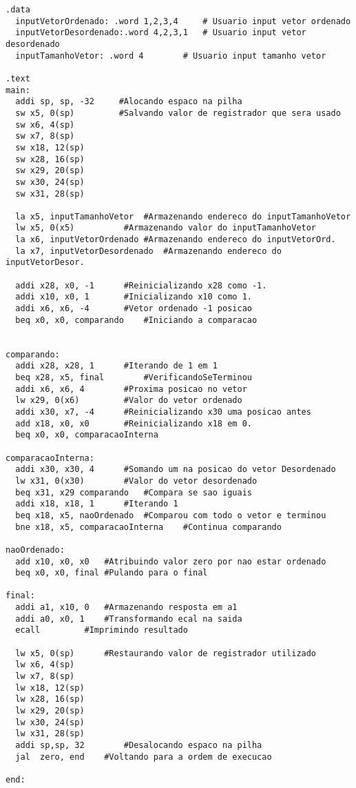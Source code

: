 \documentclass[a4paper,11pt]{article}
\theoremstyle{mytheor}
\begin{document}
\begin{small}
\begin{lstlisting}[language=riskV]
.data
  inputVetorOrdenado: .word 1,2,3,4 	# Usuario input vetor ordenado
  inputVetorDesordenado:.word 4,2,3,1 	# Usuario input vetor desordenado
  inputTamanhoVetor: .word 4 		# Usuario input tamanho vetor
    
.text
main: 
  addi sp, sp, -32     #Alocando espaco na pilha
  sw x5, 0(sp)         #Salvando valor de registrador que sera usado
  sw x6, 4(sp)
  sw x7, 8(sp)
  sw x18, 12(sp)
  sw x28, 16(sp)
  sw x29, 20(sp)
  sw x30, 24(sp)
  sw x31, 28(sp)
  
  la x5, inputTamanhoVetor 	#Armazenando endereco do inputTamanhoVetor
  lw x5, 0(x5)			#Armazenando valor do inputTamanhoVetor
  la x6, inputVetorOrdenado	#Armazenando endereco do inputVetorOrd.
  la x7, inputVetorDesordenado  #Armazenando endereco do inputVetorDesor.
  
  addi x28, x0, -1 		#Reinicializando x28 como -1.
  addi x10, x0, 1 		#Inicializando x10 como 1.
  addi x6, x6, -4 		#Vetor ordenado -1 posicao
  beq x0, x0, comparando	#Iniciando a comparacao

   
comparando:
  addi x28, x28, 1		#Iterando de 1 em 1
  beq x28, x5, final		#VerificandoSeTerminou
  addi x6, x6, 4		#Proxima posicao no vetor
  lw x29, 0(x6)			#Valor do vetor ordenado
  addi x30, x7, -4		#Reinicializando x30 uma posicao antes  
  add x18, x0, x0		#Reinicializando x18 em 0.
  beq x0, x0, comparacaoInterna
    
comparacaoInterna:
  addi x30, x30, 4 		#Somando um na posicao do vetor Desordenado
  lw x31, 0(x30)		#Valor do vetor desordenado
  beq x31, x29 comparando 	#Compara se sao iguais
  addi x18, x18, 1 		#Iterando 1
  beq x18, x5, naoOrdenado	#Comparou com todo o vetor e terminou
  bne x18, x5, comparacaoInterna 	#Continua comparando
    
naoOrdenado:
  add x10, x0, x0	#Atribuindo valor zero por nao estar ordenado
  beq x0, x0, final	#Pulando para o final
 	
final:
  addi a1, x10, 0	#Armazenando resposta em a1
  addi a0, x0, 1 	#Transformando ecal na saida
  ecall			#Imprimindo resultado
  
  lw x5, 0(sp)    	#Restaurando valor de registrador utilizado
  lw x6, 4(sp)
  lw x7, 8(sp)
  lw x18, 12(sp)
  lw x28, 16(sp)
  lw x29, 20(sp)
  lw x30, 24(sp)
  lw x31, 28(sp)
  addi sp,sp, 32     	#Desalocando espaco na pilha
  jal  zero, end	#Voltando para a ordem de execucao
  
end:
\end{lstlisting}
\end{small}
\end{document}
